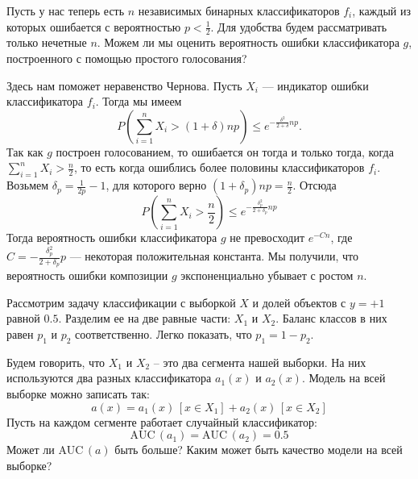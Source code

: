 \documentclass[12pt,fleqn]{article}
\begin{document}
    \begin{vkProblem}
        Пусть у нас теперь есть $n$ независимых бинарных классификаторов $f_i$, каждый из которых ошибается с вероятностью $p < \frac{1}{2}$. Для удобства будем рассматривать только нечетные $n$. Можем ли мы оценить вероятность ошибки классификатора $g$, построенного с помощью простого голосования?
    \end{vkProblem}    
    \begin{esSolution}
        Здесь нам поможет неравенство Чернова. Пусть $X_i$ — индикатор ошибки классификатора $f_i$. Тогда мы имеем
        $$
        P(\sum_{i = 1}^n X_i > (1 + \delta)np) \le e^{-\frac{\delta^2}{2 + \delta}np}.
        $$
        Так как $g$ построен голосованием, то ошибается он тогда и только тогда, когда $\sum_{i = 1}^n X_i > \frac{n}{2}$, то есть когда ошиблись более половины классификаторов $f_i$. Возьмем $\delta_p = \frac{1}{2p} - 1$, для которого верно $(1 + \delta_p)np = 
        \frac{n}{2}$. Отсюда 
        $$
        P(\sum_{i = 1}^n X_i > \frac{n}{2}) \le e^{-\frac{\delta_p^2}{2 + \delta_p}np}
        $$
        Тогда вероятность ошибки классификатора $g$ не превосходит $e^{-Cn}$, где $C = -\frac{\delta_p^2}{2 + \delta_p}p$ — некоторая положительная константа. Мы получили, что вероятность ошибки композиции $g$ экспоненциально убывает с ростом $n$.
    \end{esSolution}


    \begin{vkProblem}
        Рассмотрим задачу классификации с выборкой $X$ и долей объектов с $ y = + 1 $ равной $ 0.5 $.
        Разделим ее на две равные части: $ X_1 $ и $ X_2 $.
        Баланс классов в них равен $ p_1 $ и $ p_2 $ соответственно.
        Легко показать, что $ p_1 = 1 - p_2 $.
        
        Будем говорить, что $ X_1 $ и $ X_2 $ – это два сегмента нашей выборки.
        На них используются два разных классификатора $ a_1(x) $ и $ a_2(x) $.
        Модель на всей выборке можно записать так:
        $$
            a(x) = a_1(x)\,\left[x \in X_1\right] + a_2(x)\,\left[x \in X_2\right]
        $$
        Пусть на каждом сегменте работает случайный классификатор:
        $$
            \text{AUC}\,(a_1) = \text{AUC}\,(a_2) = 0.5
        $$
        Может ли $ \text{AUC}\,(a) $ быть больше?
        Каким может быть качество модели на всей выборке?
    \end{vkProblem}
    
\end{document}
